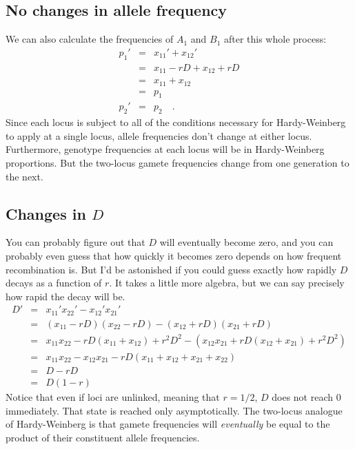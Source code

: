 \documentclass[12pt]{article}
\begin{document}
\subsection*{No changes in allele frequency}

We can also calculate the frequencies of $A_1$ and $B_1$ after this
whole process:
\begin{eqnarray*}
p_1' &=& x_{11}' + x_{12}' \\
     &=& x_{11} - rD + x_{12} + rD \\
     &=& x_{11} + x_{12} \\
     &=& p_1 \\
p_2' &=& p_2 \quad .
\end{eqnarray*}
Since each locus is subject to all of the conditions necessary for
Hardy-Weinberg to apply at a single locus, allele frequencies don't
change at either locus. Furthermore, genotype frequencies at each
locus will be in Hardy-Weinberg proportions. But the two-locus gamete
frequencies change from one generation to the next.

\subsection*{Changes in $D$}

You can probably figure out that $D$ will eventually become zero, and
you can probably even guess that how quickly it becomes zero depends
on how frequent recombination is. But I'd be astonished if you could
guess exactly how rapidly $D$ decays as a function of $r$.  It takes a
little more algebra, but we can say precisely how rapid the decay will
be.
\begin{eqnarray*}
D' &=& x_{11}'x_{22}' - x_{12}'x_{21}' \\
   &=& (x_{11} - rD)(x_{22} - rD) - (x_{12} + rD)(x_{21} + rD) \\
   &=& x_{11}x_{22} - rD(x_{11} + x_{12}) + r^2D^2
       - (x_{12}x_{21} + rD(x_{12} + x_{21}) + r^2D^2) \\
   &=& x_{11}x_{22} - x_{12}x_{21} - rD(x_{11} + x_{12} + x_{21} + x_{22}) \\
   &=& D - rD \\
   &=& D(1-r)
\end{eqnarray*}
Notice that even if loci are unlinked, meaning that $r = 1/2$, $D$
does not reach 0 immediately. That state is reached only
asymptotically. The two-locus analogue of Hardy-Weinberg is that
gamete frequencies will {\it eventually\/} be equal to the product of
their constituent allele frequencies.

\ccLicense
\end{document}
